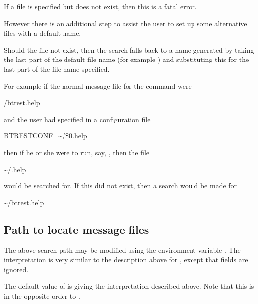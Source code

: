 If a file is specified but does not exist, then this is a fatal error.

However there is an additional step to assist the user to set up some alternative files with a default name.

Should the file not exist, then the search falls back to a name generated by taking the last part of the default file name (for example
) and substituting this for the last part of the file name specified.

For example if the normal message file for the command were

\begin{expara}

\helpdirname/btrest.help

\end{expara}

and the user had specified in a configuration file

\begin{expara}

BTRESTCONF=\~{}/\$0.help

\end{expara}

then if he or she were to run, say, \PrBtr{}, then the file

\begin{expara}

\~{}/\BtrName.help

\end{expara}

would be searched for. If this did not exist, then a search would be made for

\begin{expara}

\~{}/btrest.help

\end{expara}

\subsection{Path to locate message files}
The above search path may be modified using the environment variable \helppathvar. The interpretation is very similar to
the description above for \configpathvar, except that \exampletext{{}-} fields are ignored.

The default value of \helppathvar{} is  giving the interpretation described above. Note that this is in the opposite order to
\configpathvar.

